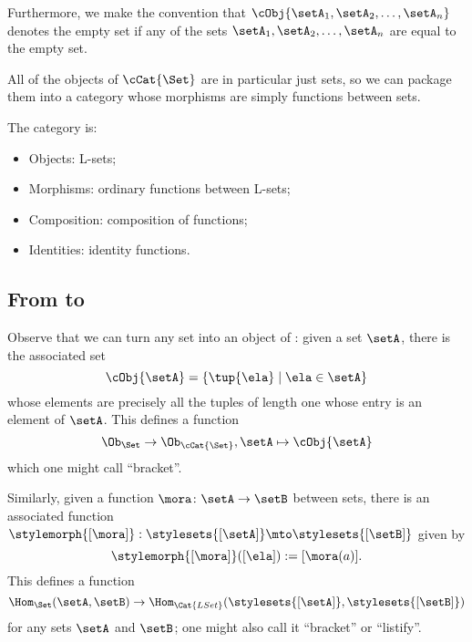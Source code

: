 Furthermore, we make the convention that $ \cObj{\setA_1, \setA_2, \dots, \setA_n}$ denotes the empty set if any of the sets $\setA_1, \setA_2, \dots , \setA_n$ are equal to the empty set. 



All of the objects of $\cCat{\Set}$ are in particular just sets, so we can package them into a category whose morphisms are simply functions between sets.

\begin{ctdefinition}[\cCat{\Set}]
    The category \cCat{\Set} is:

    \begin{itemize}
        \item Objects: L-sets;
        \item Morphisms: ordinary functions between L-sets;
        \item Composition: composition of functions;
        \item Identities: identity functions.
    \end{itemize}
\end{ctdefinition}

\subsection{From \Set to \cCat{\Set}}

Observe that we can turn any set into an object of \cCat{\Set}: given a set $\setA$, there is the associated set
\begin{equation}
\cObj{\setA} = \{ \tup{\ela} \mid \ela \in \setA \}
\end{equation}
whose elements are precisely all the tuples of length one whose entry is an element of $\setA$. This defines a function
\begin{equation}
\Ob_{\Set} \to \Ob_{\cCat{\Set}}, \setA \mapsto \cObj{\setA}
\end{equation}
which one might call ``bracket''. 

Similarly, given a function $\mora \colon \setA \to \setB$ between sets, there is an associated function $\stylemorph{[ \mora ]}: \stylesets{[\setA]} \mto \stylesets{[\setB]}$ given by 
\begin{equation}
\stylemorph{[ \mora ]} ([ \ela ]) := [\mora(a)].
\end{equation}
This defines a function 
\begin{equation}
\Hom_{\Set}(\setA,\setB) \to \Hom_{\Cat{LSet}}(\stylesets{[\setA]},\stylesets{[\setB]})
\end{equation}
for any sets $\setA$ and $\setB$; one might also call it ``bracket'' or ``listify''.





